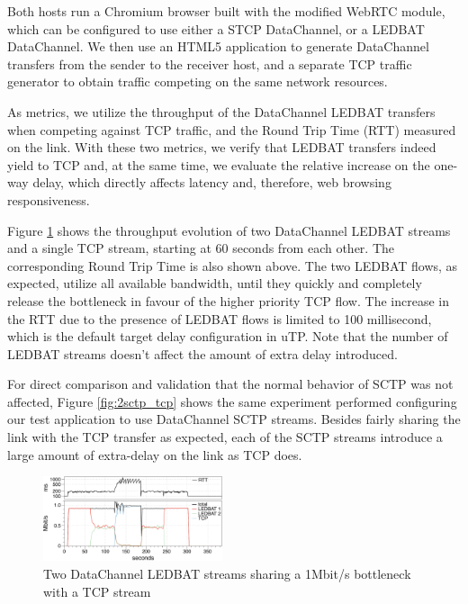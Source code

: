 \documentclass{sig-alternate}
\begin{document}
Both hosts run a Chromium browser built with the modified WebRTC module, which can be configured to use either a STCP DataChannel, or a LEDBAT DataChannel. We then use an HTML5 application to generate DataChannel transfers from the sender to the receiver host, and a separate TCP traffic generator to obtain traffic competing on the same network resources.

As metrics, we utilize the throughput of the DataChannel LEDBAT transfers when competing
against TCP traffic, and the Round Trip Time (RTT) measured on the link. With these two
metrics, we verify that LEDBAT transfers indeed yield to TCP and, at the same time, we
evaluate the relative increase on the one-way delay, which directly affects latency and,
therefore, web browsing responsiveness.

Figure \ref{fig:2ledbat_tcp} shows the throughput evolution of two DataChannel LEDBAT
streams and a single TCP stream, starting at 60 seconds from each other. The corresponding
Round Trip Time is also shown above. The two LEDBAT flows, as expected, utilize all
available bandwidth, until they quickly and completely release the bottleneck in favour of
the higher priority TCP flow. The increase in the RTT due to the presence of LEDBAT flows
is limited to 100 millisecond, which is the default target delay configuration in
uTP. Note that the number of LEDBAT streams doesn't affect the amount of extra delay
introduced.


For direct comparison and validation that the normal behavior of SCTP was not affected,
Figure \ref{fig:2sctp_tcp} shows the same experiment performed configuring our test
application to use DataChannel SCTP streams. Besides fairly sharing the link with the TCP
transfer as expected, each of the SCTP streams introduce a large amount of extra-delay on
the link as TCP does.


\begin{figure}[t]
  \centering
    \includegraphics[width=0.47\textwidth]{figs/2ledbat_tcp}
\vspace*{-0.38cm}
	\caption{Two DataChannel LEDBAT streams sharing a 1Mbit/s bottleneck with a TCP stream} \label{fig:2ledbat_tcp}
\end{figure}
\end{document}

